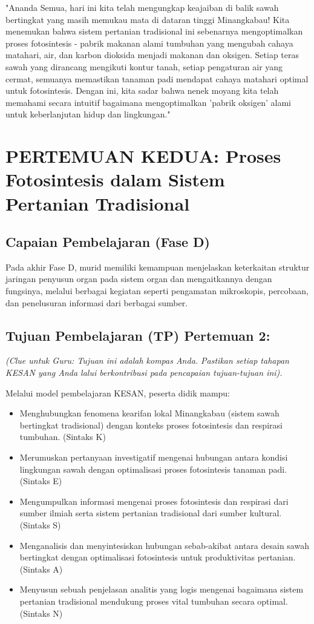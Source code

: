 \documentclass[a4paper,12pt]{article}
\begin{document}
\begin{tcolorbox}[sectionbox]
"Ananda Semua, hari ini kita telah mengungkap keajaiban di balik sawah bertingkat yang masih memukau mata di dataran tinggi Minangkabau! Kita menemukan bahwa sistem pertanian tradisional ini sebenarnya mengoptimalkan proses fotosintesis - pabrik makanan alami tumbuhan yang mengubah cahaya matahari, air, dan karbon dioksida menjadi makanan dan oksigen. Setiap teras sawah yang dirancang mengikuti kontur tanah, setiap pengaturan air yang cermat, semuanya memastikan tanaman padi mendapat cahaya matahari optimal untuk fotosintesis. Dengan ini, kita sadar bahwa nenek moyang kita telah memahami secara intuitif bagaimana mengoptimalkan 'pabrik oksigen' alami untuk keberlanjutan hidup dan lingkungan."
\end{tcolorbox}

\section{PERTEMUAN KEDUA: Proses Fotosintesis dalam Sistem Pertanian Tradisional}

\subsection{Capaian Pembelajaran (Fase D)}
Pada akhir Fase D, murid memiliki kemampuan menjelaskan keterkaitan struktur jaringan penyusun organ pada sistem organ dan mengaitkannya dengan fungsinya, melalui berbagai kegiatan seperti pengamatan mikroskopis, percobaan, dan penelusuran informasi dari berbagai sumber.

\subsection{Tujuan Pembelajaran (TP) Pertemuan 2:}
\textit{(Clue untuk Guru: Tujuan ini adalah kompas Anda. Pastikan setiap tahapan KESAN yang Anda lalui berkontribusi pada pencapaian tujuan-tujuan ini).}

Melalui model pembelajaran KESAN, peserta didik mampu:
\begin{itemize}
\item Menghubungkan fenomena kearifan lokal Minangkabau (sistem sawah bertingkat tradisional) dengan konteks proses fotosintesis dan respirasi tumbuhan. (Sintaks K)
\item Merumuskan pertanyaan investigatif mengenai hubungan antara kondisi lingkungan sawah dengan optimalisasi proses fotosintesis tanaman padi. (Sintaks E)
\item Mengumpulkan informasi mengenai proses fotosintesis dan respirasi dari sumber ilmiah serta sistem pertanian tradisional dari sumber kultural. (Sintaks S)
\item Menganalisis dan menyintesiskan hubungan sebab-akibat antara desain sawah bertingkat dengan optimalisasi fotosintesis untuk produktivitas pertanian. (Sintaks A)
\item Menyusun sebuah penjelasan analitis yang logis mengenai bagaimana sistem pertanian tradisional mendukung proses vital tumbuhan secara optimal. (Sintaks N)
\end{itemize}
\end{document}
